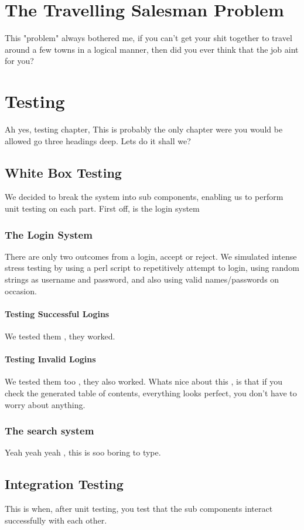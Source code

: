 \documentclass[12pt,a4paper]{report}
\begin{document}
\chapter{The Travelling Salesman Problem}
This "problem" always bothered me, if you can't get your shit together to travel around a few towns in a logical manner, then did you ever think that the job aint for you?
\chapter{Testing}

Ah yes, testing chapter, This is probably the only chapter were you would be allowed go three headings deep. Lets do it shall we?
\section{White Box Testing}
We decided to break the system into sub components, enabling us to perform unit testing on each part. First off, is the login system
\subsection{The Login System}
There are only two outcomes from a login, accept or reject. We simulated intense stress testing by using a perl script to repetitively attempt to login, 
using random strings as username and password, and also using valid names/passwords on occasion. 
\subsubsection{Testing Successful Logins}
We tested them , they worked. 
\subsubsection{Testing Invalid Logins}
We tested them too , they also worked. Whats nice about this , is that if you check the generated table of contents, everything looks perfect, you don't have to 
worry about anything. 
\subsection{The search system}
Yeah yeah yeah , this is soo boring to type.
\section{Integration Testing}
This is when, after unit testing, you test that the sub components interact successfully with each other. 
\end{document}
